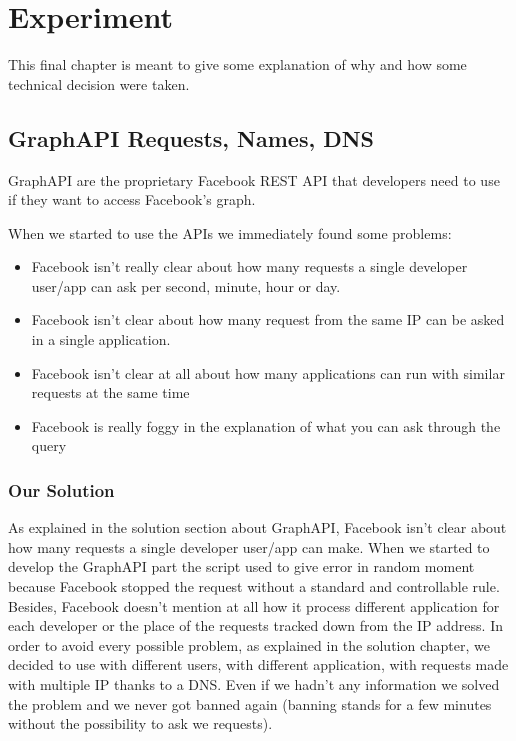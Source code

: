 \chapter{Experiment} 
This final chapter is meant to give some explanation of why and how some technical decision were taken.

\section{GraphAPI Requests, Names, DNS}
GraphAPI are the proprietary Facebook REST API that developers need to use if they want to access Facebook's graph. 

When we started to use the APIs we immediately found some problems:

\begin{itemize}
\item Facebook isn't really clear about how many requests a single developer user/app can ask per second, minute, hour or day.
\item Facebook isn't clear about how many request from the same IP can be asked in a single application.
\item Facebook isn't clear at all about how many applications can run with similar requests at the same time
\item Facebook is really foggy in the explanation of what you can ask through the query
\end{itemize}

\subsection*{Our Solution}
As explained in the solution section about GraphAPI, Facebook isn't clear about how many requests a single developer user/app can make. When we started to develop the GraphAPI part the script used to give error in random moment because Facebook stopped the request without a standard and controllable rule. Besides, Facebook doesn't mention at all how it process different application for each developer or the place of the requests tracked down from the IP address.
In order to avoid every possible problem, as explained in the solution chapter, we decided to use with different users, with different application, with requests made with multiple IP thanks to a DNS. Even if we hadn't any information we solved the problem and we never got banned again (banning stands for a few minutes without the possibility to ask we requests).


